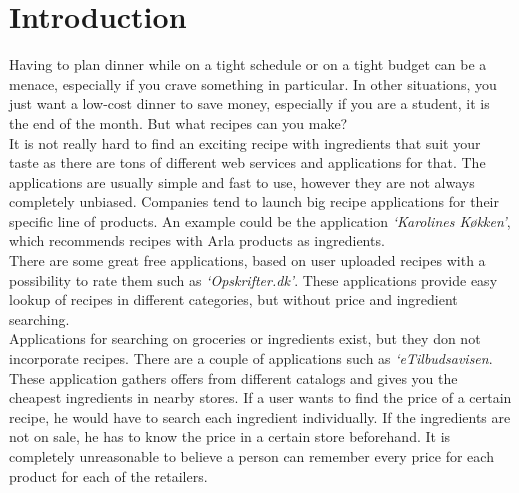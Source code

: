 \chapter{Introduction}
\label{chap:intro}

Having to plan dinner while on a tight schedule or on a tight budget can be a menace, especially if you crave something in particular. In other situations, you just want a low-cost dinner to save money, especially if you are a student, it is the end of the month. But what recipes can you make?\\
It is not really hard to find an exciting recipe with ingredients that suit your taste as there are tons of different web services and applications for that. The applications are usually simple and fast to use, however they are not always completely unbiased. Companies tend to launch big recipe applications for their specific line of products. An example could be the application \emph{`Karolines Køkken'}\cite{arla}, which recommends recipes with Arla products as ingredients.\\
There are some great free applications, based on user uploaded recipes with a possibility to rate them such as \emph{`Opskrifter.dk'}\cite{opskrifterdk}. These applications provide easy lookup of recipes in different categories, but without price and ingredient searching. \\
Applications for searching on groceries or ingredients exist, but they don not incorporate recipes. There are a couple of applications such as \emph{`eTilbudsavisen}\cite{etilbudsavis}. These application gathers offers from different catalogs and gives you the cheapest ingredients in nearby stores. If a user wants to find the price of a certain recipe, he would have to search each ingredient individually. If the ingredients are not on sale, he has to know the price in a certain store beforehand. It is completely unreasonable to believe a person can remember every price for each product for each of the retailers.






